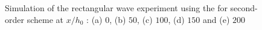 \documentclass[SingleSpace,12pt]{Serre_ASCE}
\begin{document}
\begin{figure}[htb]
\caption{Simulation of the rectangular wave experiment using the for second-order scheme at $x/h_0$ : (a) $0$, (b) $50$, (c) $100$, (d) $150$ and (e) $200$}
\label{fig:Seguro2}
\end{figure}
%
\end{document}
